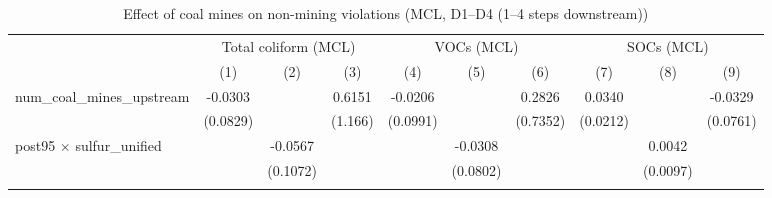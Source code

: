 
\begin{table}[htbp]
   
   \caption{\label{2sls_4step_d1_d4_nonminevio_mcl} Effect of coal mines on non-mining violations (MCL, D1--D4 (1--4 steps downstream))}
   \bigskip
   
   \centering
   
   \begin{adjustbox}{width = \textwidth, center}
      
      
      \begin{tabular}{lccccccccc}
         \toprule
         
          & \multicolumn{3}{c}{Total coliform (MCL)} & \multicolumn{3}{c}{VOCs (MCL)} & \multicolumn{3}{c}{SOCs (MCL)}\\
         
                                                           & (1)           & (2)           & (3)           & (4)                   & (5)                   & (6)                   & (7)           & (8)                   & (9)\\  
         
         \midrule 
         num\_coal\_mines\_upstream                        & -0.0303       &               & 0.6151        & -0.0206               &                       & 0.2826                & 0.0340        &                       & -0.0329\\   
                                                           & (0.0829)      &               & (1.166)       & (0.0991)              &                       & (0.7352)              & (0.0212)      &                       & (0.0761)\\   
         post95 $\times$ sulfur\_unified                   &               & -0.0567       &               &                       & -0.0308               &                       &               & 0.0042                &   \\   
                                                           &               & (0.1072)      &               &                       & (0.0802)              &                       &               & (0.0097)              &   \\   
         
          \\
         

\end{tabular}
\end{adjustbox}
\end{table}

